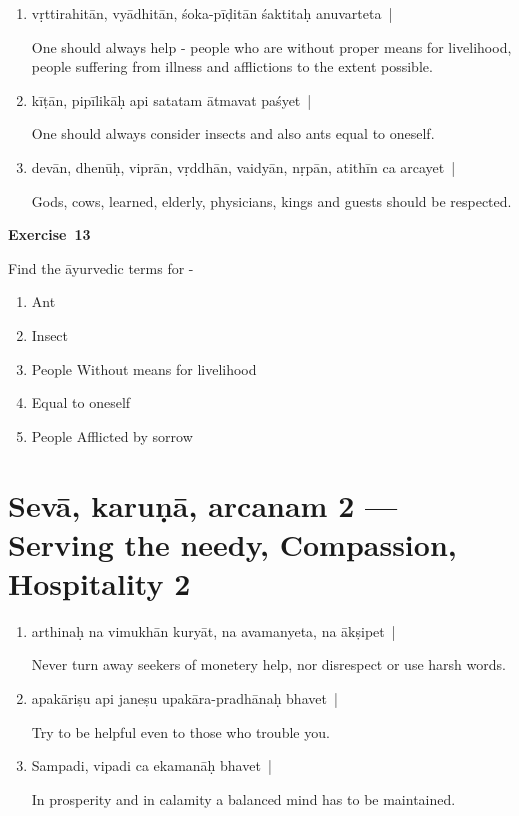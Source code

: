 \begin{enumerate}
\itemsep=0pt
\item {}

vṛttirahitān, vyādhitān, śoka-pīḍitān śaktitaḥ anuvarteta~| 

One should always help - people who are without proper means for livelihood, people suffering from illness and afflictions to the extent possible.   

\item {}

kīṭān, pipīlikāḥ api satatam ātmavat paśyet~| 

One should always consider insects and also ants equal to oneself. 

\item {}

devān, dhenūḥ, viprān, vṛddhān, vaidyān, nṛpān, atithīn ca arcayet~|   

Gods, cows, learned, elderly, physicians, kings and guests should be respected.
\end{enumerate}

\centerline{\textbf{Exercise~13}}

Find the āyurvedic terms for -
\begin{enumerate}
\itemsep=0pt
\renewcommand{\theenumi}{\alph{enumi}}
\renewcommand{\labelenumi}{\theenumi.}
\item Ant
\item Insect
\item People Without means for livelihood
\item Equal to oneself
\item People Afflicted by sorrow
\end{enumerate}

\chapter{Sevā, karuṇā, arcanam  2 --- Serving the needy, Compassion, Hospitality  2}

\begin{enumerate}
\itemsep=0pt
\item {}

arthinaḥ na vimukhān kuryāt, na avamanyeta, na ākṣipet~|

Never turn away seekers of monetery help, nor disrespect or use harsh words.  

\item {}

apakāriṣu api janeṣu upakāra-pradhānaḥ bhavet~| 

Try to be helpful even to those who trouble you. 

\item {}

Sampadi, vipadi ca ekamanāḥ bhavet~|

In prosperity and in calamity a balanced mind has to be maintained.
\end{enumerate}

